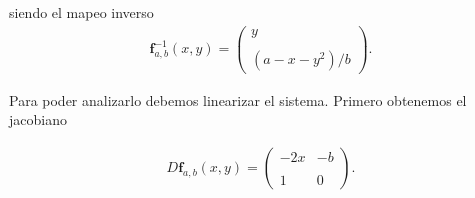 siendo el mapeo inverso
\begin{eqnarray}
\mathbf{f}^{-1}_{a,b}(x,y)=\left( \begin{array}{lcc}
             y\\
             \\ (a-x-y^{2})/b
             \end{array}
             \right). \label{HenonI}
\end{eqnarray} 

       
Para poder analizarlo debemos linearizar el sistema. Primero obtenemos el jacobiano 
            
\begin{eqnarray}
D\mathbf{f}_{a,b}(x,y)= \left( \begin{array}{lcc}
                -2x & -b\\
                \\ 1 & 0
                \end{array}
                \right).
\end{eqnarray}

